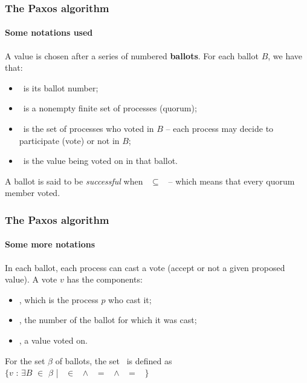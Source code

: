 \documentclass{beamer}
\begin{document}
\begin{frame}
  \frametitle{The Paxos algorithm}
  \framesubtitle{Some notations used}
  
  A value is chosen after a series of numbered \textbf{ballots}. For each ballot $B$, we have that:
  \begin{itemize}
    \item \bbal\ is its ballot number; %
    \item \bqrm\ is a nonempty finite set of processes (quorum);
    \item \bvot\ is the set of processes who voted in $B$ -- each process may decide to participate (vote) or not in $B$;
    \item \bval\ is the value being voted on in that ballot.
  \end{itemize}
  
  \vspace{4 mm}
  A ballot is said to be \emph{successful} when \bqrm\ $\subseteq$ \bvot\ -- which means that every quorum member voted.

\end{frame}

\begin{frame}
  \frametitle{The Paxos algorithm}
  \framesubtitle{Some more notations}
  
  In each ballot, each process can cast a vote (accept or not a given proposed value). A vote $v$ has the components:

  \begin{itemize}
    \item \vp, which is the process $p$ who cast it;
    \item \vbal, the number of the ballot for which it was cast;
    \item \vval, a value voted on.
  \end{itemize}
  
  \vspace{4 mm}
 For the set $\beta$ of ballots, the set \votesbeta\ is defined as\\
 $\{v$ : $\exists B$ $\in$ $\beta$ | \vp\ $\in$ \bvot\ $\wedge$ \vbal\ $=$ \bbal\ $\wedge$ \vval\ $=$ \bval\ $\}$ 

\end{frame}
\end{document}

